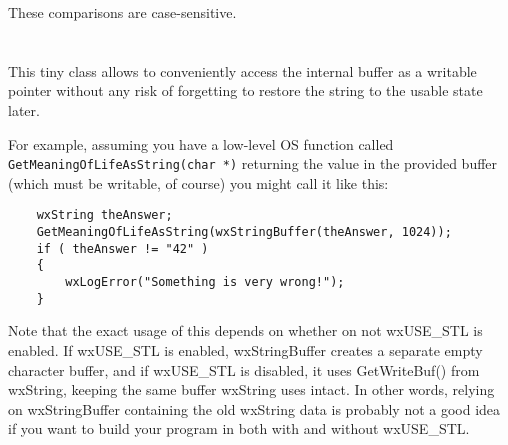 









These comparisons are case-sensitive.


\section{}\label{wxstringbuffer}

This tiny class allows to conveniently access the  
internal buffer as a writable pointer without any risk of forgetting to restore
the string to the usable state later.

For example, assuming you have a low-level OS function called 
{\tt GetMeaningOfLifeAsString(char *)} returning the value in the provided
buffer (which must be writable, of course) you might call it like this:

\begin{verbatim}
    wxString theAnswer;
    GetMeaningOfLifeAsString(wxStringBuffer(theAnswer, 1024));
    if ( theAnswer != "42" )
    {
        wxLogError("Something is very wrong!");
    }
\end{verbatim}

Note that the exact usage of this depends on whether on not wxUSE\_STL is enabled.  If
wxUSE\_STL is enabled, wxStringBuffer creates a separate empty character buffer, and
if wxUSE\_STL is disabled, it uses GetWriteBuf() from wxString, keeping the same buffer
wxString uses intact.  In other words, relying on wxStringBuffer containing the old 
wxString data is probably not a good idea if you want to build your program in both
with and without wxUSE\_STL.

